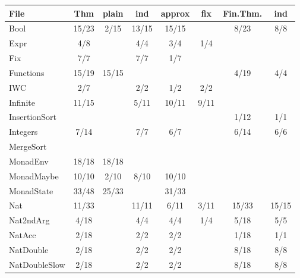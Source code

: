 %
%
%
%
\begin{tabular}{>{\footnotesize}l || >{\footnotesize}c | >{\footnotesize}c | >{\footnotesize}c | >{\footnotesize}c | >{\footnotesize}c || >{\footnotesize}c | >{\footnotesize}c}
File                               & Thm & plain & ind & approx & fix & Fin.Thm. & ind \\
\hline
Bool                       & 15/23 & 2/15 & 13/15 & 15/15 &  & 8/23 & 8/8\\
Expr                       & 4/8 &  & 4/4 & 3/4 & 1/4 &  & \\
Fix                        & 7/7 &  & 7/7 & 1/7 &  &  & \\
Functions                  & 15/19 & 15/15 &  &  &  & 4/19 & 4/4\\
IWC                        & 2/7 &  & 2/2 & 1/2 & 2/2 &  & \\
Infinite                   & 11/15 &  & 5/11 & 10/11 & 9/11 &  & \\
InsertionSort              &  &  &  &  &  & 1/12 & 1/1\\
Integers                   & 7/14 &  & 7/7 & 6/7 &  & 6/14 & 6/6\\
MergeSort                  &  &  &  &  &  &  & \\
MonadEnv                   & 18/18 & 18/18 &  &  &  &  & \\
MonadMaybe                 & 10/10 & 2/10 & 8/10 & 10/10 &  &  & \\
MonadState                 & 33/48 & 25/33 &  & 31/33 &  &  & \\
Nat                        & 11/33 &  & 11/11 & 6/11 & 3/11 & 15/33 & 15/15\\
Nat2ndArg                  & 4/18 &  & 4/4 & 4/4 & 1/4 & 5/18 & 5/5\\
NatAcc                     & 2/18 &  & 2/2 & 2/2 &  & 1/18 & 1/1\\
NatDouble                  & 2/18 &  & 2/2 & 2/2 &  & 8/18 & 8/8\\
NatDoubleSlow              & 2/18 &  & 2/2 & 2/2 &  & 8/18 & 8/8\\

\end{tabular}

